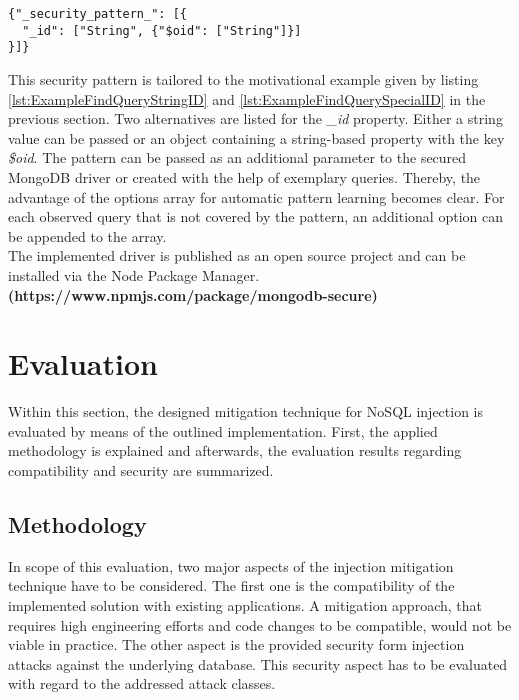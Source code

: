 \begin{lstlisting}[escapechar=!, caption={Security pattern allowing string-based and object-based identifiers as a query parameter}, label={lst:http_request_example}]
{"_security_pattern_": [{
  "_id": ["String", {"$oid": ["String"]}]
}]}
\end{lstlisting}

This security pattern is tailored to the motivational example given by listing \ref{lst:ExampleFindQueryStringID} and \ref{lst:ExampleFindQuerySpecialID} in the previous section. Two alternatives are listed for the \emph{\_id} property. Either a string value can be passed or an object containing a string-based property with the key \emph{\$oid}. The pattern can be passed as an additional parameter to the secured MongoDB driver or created with the help of exemplary queries. Thereby, the advantage of the options array for automatic pattern learning becomes clear. For each observed query that is not covered by the pattern, an additional option can be appended to the array. \\

The implemented driver is published as an open source project and can be installed via the Node Package Manager. \textbf{(https://www.npmjs.com/package/mongodb-secure)}


\section{Evaluation}
\label{sec:evaluation}
Within this section, the designed mitigation technique for NoSQL injection is evaluated by means of the outlined implementation. First, the applied methodology is explained and afterwards, the evaluation results regarding compatibility and security are summarized.

\subsection{Methodology}
In scope of this evaluation, two major aspects of the injection mitigation technique have to be considered. The first one is the compatibility of the implemented solution with existing applications. A mitigation approach, that requires high engineering efforts and code changes to be compatible, would not be viable in practice. The other aspect is the provided security form injection attacks against the underlying database. This security aspect has to be evaluated with regard to the addressed attack classes. \\

